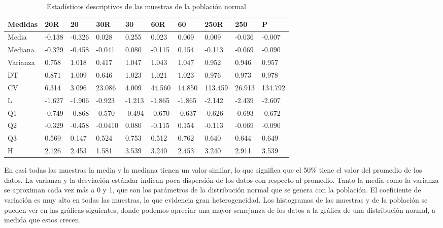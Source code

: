 \documentclass[a4paper,10pt,twocolumn]{report}
\begin{document}
	\begin{table}[htb]	
		\begin{tabular}[htb]{l|lllllllll}
			Medidas  & 20R    & 20     & 30R     & 30     & 60R    & 60     & 250R    & 250    & P       \\\hline
			Media    & -0.138 & -0.326 & 0.028   & 0.255  & 0.023  & 0.069  & 0.009   & -0.036 & -0.007  \\
			Mediana  & -0.329 & -0.458 & -0.041  & 0.080  & -0.115 & 0.154  & -0.113  & -0.069 & -0.090  \\
			Varianza & 0.758  & 1.018  & 0.417   & 1.047  & 1.043  & 1.047  & 0.952   & 0.946  & 0.957   \\
			DT       & 0.871  & 1.009  & 0.646   & 1.023  & 1.021  & 1.023  & 0.976   & 0.973  & 0.978   \\
			CV       & 6.314  & 3.096  & 23.086  & 4.009  & 44.560 & 14.850 & 113.459 & 26.913 & 134.792 \\
			L        & -1.627 & -1.906 & -0.923  & -1.213 & -1.865 & -1.865 & -2.142  & -2.439 & -2.607  \\
			Q1       & -0.749 & -0.868 & -0.570  & -0.494 & -0.670 & -0.637 & -0.626  & -0.693 & -0.672  \\
			Q2       & -0.329 & -0.458 & -0.0410 & 0.080  & -0.115 & 0.154  & -0.113  & -0.069 & -0.090  \\
			Q3       & 0.569  & 0.147  & 0.524   & 0.753  & 0.512  & 0.762  & 0.640   & 0.644  & 0.649   \\
			H        & 2.126  & 2.453  & 1.581   & 3.539  & 3.240  & 2.453  & 3.240   & 2.911  & 3.539  \\
		\end{tabular}
		\label{tab:2.1}
		\caption{Estadísticos descriptivos de las muestras de la población normal}
	\end{table}


	En casi todas las muestras la media y la mediana tienen un valor similar, lo que significa que el 50\% tiene el valor del promedio de los datos. La varianza y la desviación estándar indican poca dispersión de los datos con respecto al promedio. Tanto la media como la varianza se aproximan cada vez más a 0 y 1, que son los parámetros de la distribución normal que se genera con la población. El coeficiente de variación es muy alto en todas las muestras, lo que evidencia gran heterogeneidad. Los histogramas de las muestras y de la población se pueden ver en las gráficas siguientes, donde podemos apreciar una mayor semejanza de los datos a la gráfica de una distribución normal, a medida que estos crecen.
\end{document}
